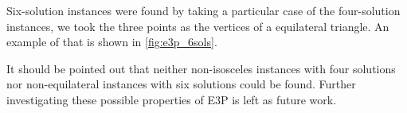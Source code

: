 Six-solution instances were found by taking a particular case of the four-solution instances, we took the three points as the vertices of a equilateral triangle. An example of that is shown in \autoref{fig:e3p_6sols}.

It should be pointed out that neither non-isosceles instances with four solutions nor non-equilateral instances with six solutions could be found. Further investigating these possible properties of E3P is left as future work.
